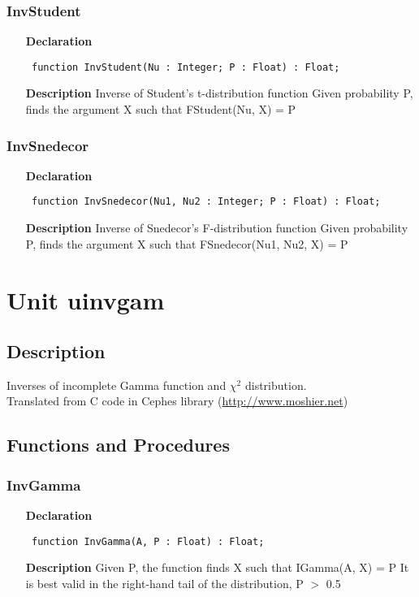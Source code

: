 \documentclass[12pt,a4paper,oneside]{report}
\newcommand{\declarationitem}[1]{\textbf{#1}}
\newcommand{\descriptiontitle}[1]{\textbf{#1}}
\newcommand{\code}[1]{\texttt{#1}}
\begin{document}
\subsubsection{InvStudent}
\label{uinvbeta-InvStudent}
\begin{itemize}\item[\declarationitem{Declaration}\hfill]
	\begin{flushleft}
		\code{
			function InvStudent(Nu : Integer; P : Float) : Float;}
	\end{flushleft}
	\item[\descriptiontitle{Description}]
	Inverse of Student's t{-}distribution function Given probability P, finds the argument X such that FStudent(Nu, X) = P
\end{itemize}
\subsubsection{InvSnedecor}
\label{uinvbeta-InvSnedecor}
\begin{itemize}\item[\declarationitem{Declaration}\hfill]
	\begin{flushleft}
		\code{
			function InvSnedecor(Nu1, Nu2 : Integer; P : Float) : Float;}
	\end{flushleft}
	\item[\descriptiontitle{Description}]
	Inverse of Snedecor's F{-}distribution function Given probability P, finds the argument X such that FSnedecor(Nu1, Nu2, X) = P
\end{itemize}
\section{Unit uinvgam}
\label{uinvgam}
\subsection{Description}
Inverses of incomplete Gamma function and $\chi^2$ distribution.\\ Translated from C code in Cephes library (\href{http://www.moshier.net}{http://www.moshier.net}) 
\subsection{Functions and Procedures}
\subsubsection{InvGamma}
\label{uinvgam-InvGamma}
\begin{itemize}\item[\declarationitem{Declaration}\hfill]
	\begin{flushleft}
		\code{
			function InvGamma(A, P : Float) : Float;}
	\end{flushleft}
	\item[\descriptiontitle{Description}]
	Given P, the function finds X such that IGamma(A, X) = P It is best valid in the right{-}hand tail of the distribution, P {$>$} 0.5
\end{itemize}
\end{document}

